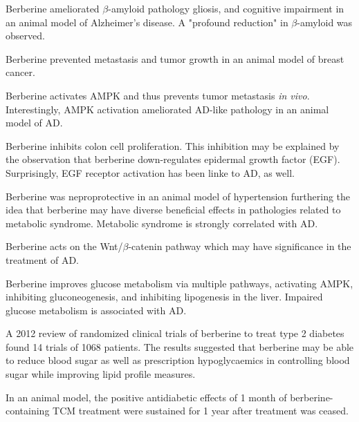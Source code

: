 \documentclass[twocolumn]{article}
\begin{document}
Berberine ameliorated $\beta$-amyloid pathology
gliosis, and cognitive impairment in an
animal model of Alzheimer's disease.
A "profound reduction" in $\beta$-amyloid was observed.
\cite{durairajan2012berberine}


Berberine prevented metastasis and tumor growth in
an animal model of breast cancer.
\cite{refaat2013berberine}

Berberine activates AMPK and thus prevents
tumor metastasis \textit{in vivo}.
\cite{kim2012berberine}
Interestingly, AMPK activation ameliorated AD-like pathology
in an animal model of AD.
\cite{du2015ampk}

Berberine inhibits colon cell proliferation.
This inhibition may be explained by the observation that
berberine down-regulates epidermal growth factor (EGF).
\cite{wang2013berberine}
Surprisingly, EGF receptor activation has been
linke to AD, as well.
\cite{birecree1988immunoreactive}

Berberine was neproprotective in an animal model of
hypertension furthering the idea that berberine
may have diverse beneficial effects in
pathologies related to metabolic syndrome.
\cite{kishimoto2015effects}
Metabolic syndrome is strongly correlated with AD.
\cite{razay2007metabolic}


Berberine acts on the Wnt/$\beta$-catenin pathway
\cite{wu2012berberine}
which may have significance in the treatment of AD.
\cite{esposito2006marijuana}




Berberine improves glucose metabolism via multiple pathways,
activating AMPK, inhibiting gluconeogenesis,
and inhibiting lipogenesis in the liver.
\cite{xia2011berberine}
Impaired glucose metabolism is associated with AD.
\cite{baker2011insulin}

A 2012 review of randomized clinical trials of berberine
to treat type 2 diabetes found 14 trials of 1068 patients.
The results suggested that berberine may be able to reduce
blood sugar as well as prescription hypoglycaemics
in controlling blood sugar while improving lipid profile measures.
\cite{dong2012berberine}

In an animal model,
the positive antidiabetic effects of
1 month of berberine-containing TCM treatment
were sustained for 1 year after treatment was ceased.
\cite{zhao2012sustained}
\end{document}
